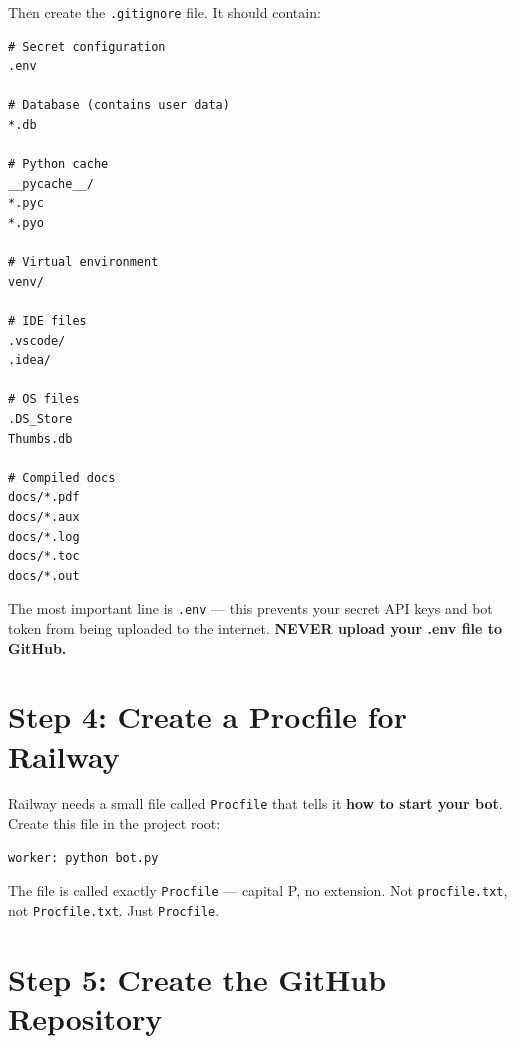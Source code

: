 Then create the \texttt{.gitignore} file. It should contain:

\begin{lstlisting}[style=envstyle, title={.gitignore --- Files to NOT upload}]
# Secret configuration
.env

# Database (contains user data)
*.db

# Python cache
__pycache__/
*.pyc
*.pyo

# Virtual environment
venv/

# IDE files
.vscode/
.idea/

# OS files
.DS_Store
Thumbs.db

# Compiled docs
docs/*.pdf
docs/*.aux
docs/*.log
docs/*.toc
docs/*.out
\end{lstlisting}

\begin{importantbox}
The most important line is \texttt{.env} --- this prevents your secret API keys and bot token from being uploaded to the internet. \textbf{NEVER upload your .env file to GitHub.}
\end{importantbox}

\section{Step 4: Create a Procfile for Railway}

Railway needs a small file called \texttt{Procfile} that tells it \textbf{how to start your bot}. Create this file in the project root:

\begin{lstlisting}[style=envstyle, title={Procfile (no file extension!)}]
worker: python bot.py
\end{lstlisting}

\begin{warningbox}
The file is called exactly \texttt{Procfile} --- capital P, no extension. Not \texttt{procfile.txt}, not \texttt{Procfile.txt}. Just \texttt{Procfile}.
\end{warningbox}

\section{Step 5: Create the GitHub Repository}

